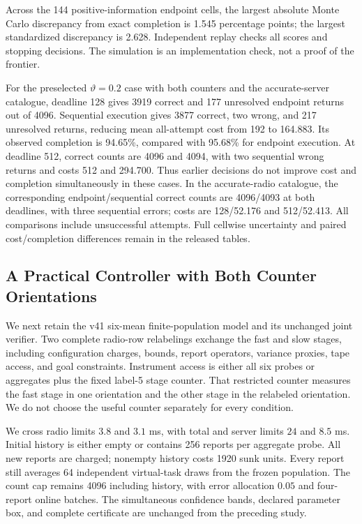 Across the 144 positive-information endpoint cells, the largest absolute
Monte Carlo discrepancy from exact completion is 1.545 percentage points;
the largest standardized discrepancy is 2.628. Independent replay checks
all scores and stopping decisions. The simulation is an implementation
check, not a proof of the frontier.

For the preselected $\vartheta=0.2$ case with both counters and the
accurate-server catalogue, deadline 128 gives 3919 correct and 177
unresolved endpoint returns out of 4096. Sequential execution gives 3877
correct, two wrong, and 217 unresolved returns, reducing mean all-attempt
cost from 192 to 164.883. Its observed completion is 94.65\%, compared
with 95.68\% for endpoint execution. At deadline 512, correct counts
are 4096 and 4094, with two sequential wrong returns and costs 512 and
294.700. Thus earlier decisions do not improve cost and completion
simultaneously in these cases. In the accurate-radio catalogue, the
corresponding endpoint/sequential correct counts are 4096/4093 at both
deadlines, with three sequential errors; costs are 128/52.176 and
512/52.413. All comparisons include unsuccessful attempts. Full
cellwise uncertainty and paired cost/completion differences remain in the
released tables.

\subsection{A Practical Controller with Both Counter Orientations}

We next retain the v41 six-mean finite-population model and its unchanged
joint verifier. Two complete radio-row relabelings exchange the fast and
slow stages, including configuration charges, bounds, report operators,
variance proxies, tape access, and goal constraints. Instrument access is
either all six probes or aggregates plus the fixed label-5 stage counter.
That restricted counter measures the fast stage in one orientation and the
other stage in the relabeled orientation. We do not choose the useful
counter separately for every condition.

We cross radio limits $3.8$ and $3.1$ ms, with total and server limits
$24$ and $8.5$ ms. Initial history is either empty or contains 256 reports
per aggregate probe. All new reports are charged; nonempty history costs
1920 sunk units. Every report still averages 64 independent virtual-task
draws from the frozen population. The count cap remains 4096 including
history, with error allocation $0.05$ and four-report online batches.
The simultaneous confidence bands, declared parameter box, and complete certificate
are unchanged from the preceding study.

